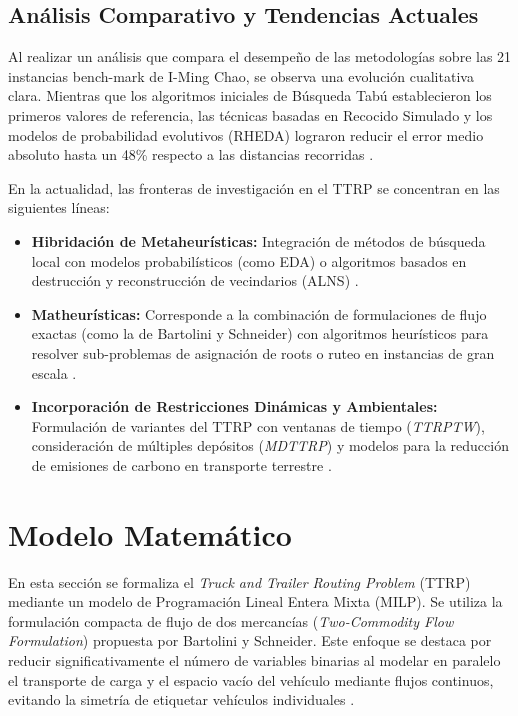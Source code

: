 \documentclass[letter, 10pt]{article}
\begin{document}
\subsection{An\'alisis Comparativo y Tendencias Actuales}

Al realizar un an\'alisis que compara el desempe\~no de las metodolog\'ias sobre las 21 instancias bench-mark de I-Ming Chao, se observa una evoluci\'on cualitativa clara.
Mientras que los algoritmos iniciales de B\'usqueda Tab\'u establecieron los primeros valores de referencia, las t\'ecnicas basadas en Recocido Simulado y los modelos de probabilidad evolutivos (RHEDA) lograron reducir el error medio absoluto hasta un 48\% respecto a las distancias recorridas \cite{perez2023radial}.

\vspace{0.3cm}

En la actualidad, las fronteras de investigaci\'on en el TTRP se concentran en las siguientes l\'ineas:
\begin{itemize}
    \item \textbf{Hibridaci\'on de Metaheur\'isticas:} Integraci\'on de m\'etodos de b\'usqueda local con modelos probabil\'isticos (como EDA) o algoritmos basados en destrucci\'on y reconstrucci\'on de vecindarios (ALNS) \cite{parragh2012hybrid, perez2023radial}.
    \item \textbf{Matheur\'isticas:} Corresponde a la combinaci\'on de formulaciones de flujo exactas (como la de Bartolini y Schneider) con algoritmos heur\'isticos para resolver sub-problemas de asignaci\'on de roots o ruteo en instancias de gran escala \cite{bartolini2020two}.
    \item \textbf{Incorporaci\'on de Restricciones Din\'amicas y Ambientales:} Formulaci\'on de variantes del TTRP con ventanas de tiempo (\textit{TTRPTW}), consideraci\'on de m\'ultiples dep\'ositos (\textit{MDTTRP}) y modelos para la reducci\'on de emisiones de carbono en transporte terrestre \cite{perez2023radial}.
\end{itemize}


\section{Modelo Matem\'atico}

En esta secci\'on se formaliza el \textit{Truck and Trailer Routing Problem} (TTRP) mediante un modelo de Programaci\'on Lineal Entera Mixta (MILP). 
Se utiliza la formulaci\'on compacta de flujo de dos mercanc\'ias (\textit{Two-Commodity Flow Formulation}) propuesta por Bartolini y Schneider. 
Este enfoque se destaca por reducir significativamente el n\'umero de variables binarias al modelar en paralelo el transporte de carga y el espacio vac\'io del veh\'iculo mediante flujos continuos, evitando la simetr\'ia de etiquetar veh\'iculos individuales \cite{bartolini2020two}.
\end{document}
